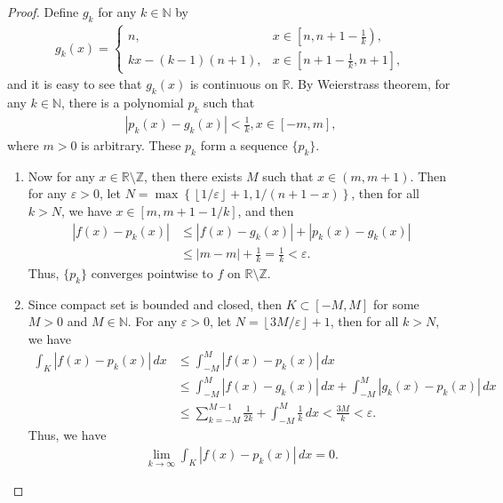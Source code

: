 \documentclass[11pt]{article}
\theoremstyle{definition}
\numberwithin{equation}{subsection}
\begin{document}
\begin{proof}
Define $g_k$ for any $k \in \mathbb{N}$ by
\begin{align*}
    g_k(x) = \begin{cases}
        n, &    x \in \left[n, n+1-\frac{1}{k}\right), \\
        kx - (k-1)(n+1), &    x \in \left[n+1-\frac{1}{k}, n+1\right],
    \end{cases}
\end{align*}
and it is easy to see that $g_k(x)$ is continuous on $\mathbb{R}$. By Weierstrass theorem, for any $k \in \mathbb{N}$, there is a polynomial $p_k$ such that 
\begin{align*}
    \left| p_k(x) - g_k(x) \right| < \frac{1}{k}, x \in [-m, m],
\end{align*}
where $m > 0$ is arbitrary. These $p_k$ form a sequence $\{p_k\}$. 
\begin{enumerate}[label=(\alph*)]
    \item Now for any $x \in \mathbb{R}\setminus \mathbb{Z}$, then there exists $M$ such that $x \in (m, m+1)$. Then for any $\varepsilon > 0$, let $N = \max\left\{\left\lfloor 1/\varepsilon \right\rfloor + 1, 1/(n + 1 - x) \right\}$, then for all $k > N$, we have $x \in [m, m + 1 - 1/k]$, and then
    \begin{align*}
        \left| f(x) - p_k(x) \right| & \leq \left| f(x) - g_k(x) \right| + \left| p_k(x) - g_k(x) \right| \\
        & \leq |m - m| + \frac{1}{k} = \frac{1}{k} < \varepsilon.
    \end{align*}
    Thus, $\{p_k\}$ converges pointwise to $f$ on $\mathbb{R}\setminus \mathbb{Z}$. 
    
    \item Since compact set is bounded and closed, then $K \subset [-M, M]$ for some $M > 0$ and $M \in \mathbb{N}$. For any $\varepsilon > 0$, let $N = \left\lfloor 3M/\varepsilon \right\rfloor + 1$, then for all $k > N$, we have
    \begin{align*}
        \int_K \left| f(x) - p_k(x) \right|\, dx & \leq \int^{M}_{-M} \left| f(x) - p_k(x) \right|\, dx \\
        & \leq \int^{M}_{-M} \left| f(x) - g_k(x) \right|\, dx + \int^{M}_{-M} \left| g_k(x) - p_k(x) \right|\, dx \\
        & \leq \sum^{M-1}_{k=-M} \frac{1}{2k} + \int^{M}_{-M} \frac{1}{k} \, dx < \frac{3M}{k} < \varepsilon.
    \end{align*}
    Thus, we have
    \begin{align*}
        \lim_{k\to\infty} \int_K \left| f(x) - p_k(x) \right|\, dx = 0.
    \end{align*}
\end{enumerate}
\end{proof}
\end{document}
